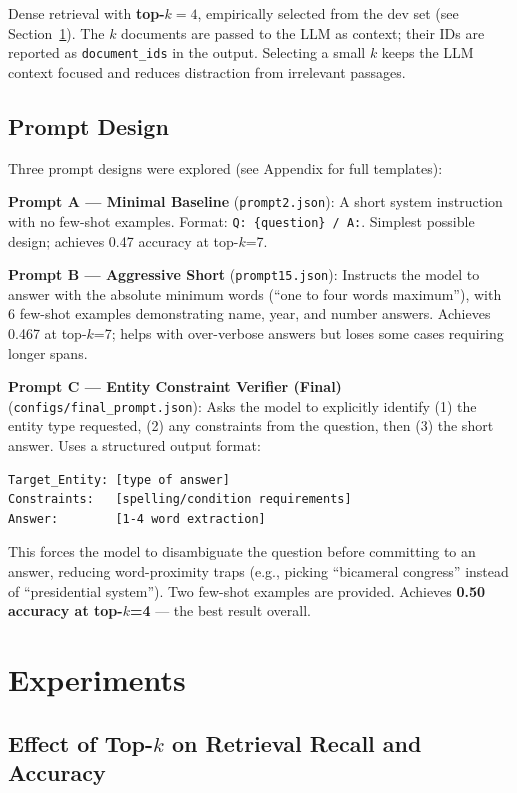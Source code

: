 \documentclass[11pt,a4paper]{article}
\begin{document}
Dense retrieval with \textbf{top-$k = 4$}, empirically selected from the dev set (see Section~\ref{sec:experiment}). The $k$ documents are passed to the LLM as context; their IDs are reported as \texttt{document\_ids} in the output. Selecting a small $k$ keeps the LLM context focused and reduces distraction from irrelevant passages.

\subsection{Prompt Design}

Three prompt designs were explored (see Appendix for full templates):

\textbf{Prompt A — Minimal Baseline} (\texttt{prompt2.json}): A short system instruction with no few-shot examples. Format: \texttt{Q: \{question\} / A:}. Simplest possible design; achieves 0.47 accuracy at top-$k$=7.

\textbf{Prompt B — Aggressive Short} (\texttt{prompt15.json}): Instructs the model to answer with the absolute minimum words (``one to four words maximum''), with 6 few-shot examples demonstrating name, year, and number answers. Achieves 0.467 at top-$k$=7; helps with over-verbose answers but loses some cases requiring longer spans.

\textbf{Prompt C — Entity Constraint Verifier (Final)} (\texttt{configs/final\_prompt.json}): Asks the model to explicitly identify (1) the entity type requested, (2) any constraints from the question, then (3) the short answer. Uses a structured output format:
\begin{lstlisting}
Target_Entity: [type of answer]
Constraints:   [spelling/condition requirements]
Answer:        [1-4 word extraction]
\end{lstlisting}
This forces the model to disambiguate the question before committing to an answer, reducing word-proximity traps (e.g., picking ``bicameral congress'' instead of ``presidential system''). Two few-shot examples are provided. Achieves \textbf{0.50 accuracy at top-$k$=4} — the best result overall.

\section{Experiments}
\label{sec:experiment}

\subsection{Effect of Top-$k$ on Retrieval Recall and Accuracy}
\end{document}
